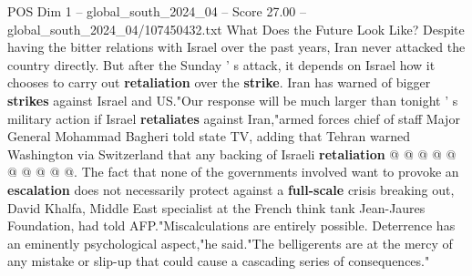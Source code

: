 \begin{textsample}{POS Dim 1 – global\_south\_2024\_04 – Score 27.00 – global\_south\_2024\_04/107450432.txt}
What Does the Future Look Like?
Despite having the bitter relations with Israel over the past years, Iran never attacked the country directly.
But after the Sunday ' s attack, it depends on Israel how it chooses to carry out \textbf{retaliation} over the \textbf{strike}.
Iran has warned of bigger \textbf{strikes} against Israel and US."Our response will be much larger than tonight ' s military action if Israel \textbf{retaliates} against Iran,"armed forces chief of staff Major General Mohammad Bagheri told state TV, adding that Tehran warned Washington via Switzerland that any backing of Israeli \textbf{retaliation} @ @ @ @ @ @ @ @ @ @.
The fact that none of the governments involved want to provoke an \textbf{escalation} does not necessarily protect against a \textbf{full-scale} crisis breaking out, David Khalfa, Middle East specialist at the French think tank Jean-Jaures Foundation, had told AFP."Miscalculations are entirely possible.
Deterrence has an eminently psychological aspect,"he said."The belligerents are at the mercy of any mistake or slip-up that could cause a cascading series of consequences."

\end{textsample}
